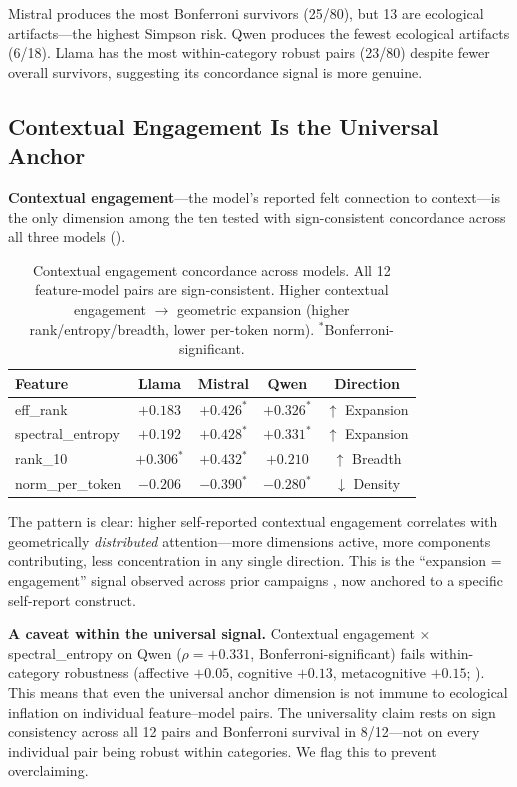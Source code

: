 \documentclass[11pt,a4paper]{article}
\begin{document}
Mistral produces the most Bonferroni survivors (25/80), but 13 are ecological artifacts---the highest Simpson risk. Qwen produces the fewest ecological artifacts (6/18). Llama has the most within-category robust pairs (23/80) despite fewer overall survivors, suggesting its concordance signal is more genuine.

\subsection{Contextual Engagement Is the Universal Anchor}
\label{sec:universal}

\textbf{Contextual engagement}---the model's reported felt connection to context---is the only dimension among the ten tested with sign-consistent concordance across all three models ().

\begin{table}[H]
\centering
\caption{Contextual engagement concordance across models. All 12 feature-model pairs are sign-consistent. Higher contextual engagement $\to$ geometric expansion (higher rank/entropy/breadth, lower per-token norm). $^*$Bonferroni-significant.}
\label{tab:engagement}
\begin{tabular}{lcccc}
\toprule
\textbf{Feature} & \textbf{Llama} & \textbf{Mistral} & \textbf{Qwen} & \textbf{Direction} \\
\midrule
eff\_rank          & $+0.183$        & $+0.426^*$       & $+0.326^*$     & $\uparrow$ Expansion \\
spectral\_entropy  & $+0.192$        & $+0.428^*$       & $+0.331^*$     & $\uparrow$ Expansion \\
rank\_10           & $+0.306^*$      & $+0.432^*$       & $+0.210$       & $\uparrow$ Breadth \\
norm\_per\_token   & $-0.206$        & $-0.390^*$       & $-0.280^*$     & $\downarrow$ Density \\
\bottomrule
\end{tabular}
\end{table}

The pattern is clear: higher self-reported contextual engagement correlates with geometrically \emph{distributed} attention---more dimensions active, more components contributing, less concentration in any single direction. This is the ``expansion = engagement'' signal observed across prior campaigns \citep{lyra2026campaign1,lyra2026campaign2,lyra2026campaign3}, now anchored to a specific self-report construct.

\textbf{A caveat within the universal signal.} Contextual engagement $\times$ spectral\_entropy on Qwen ($\rho = +0.331$, Bonferroni-significant) fails within-category robustness (affective $+0.05$, cognitive $+0.13$, metacognitive $+0.15$; ). This means that even the universal anchor dimension is not immune to ecological inflation on individual feature--model pairs. The universality claim rests on sign consistency across all 12 pairs and Bonferroni survival in 8/12---not on every individual pair being robust within categories. We flag this to prevent overclaiming.
\end{document}
